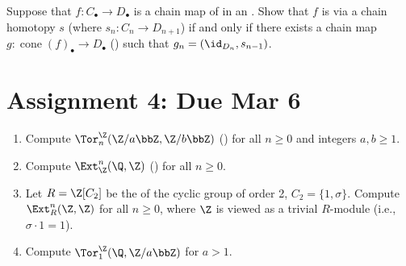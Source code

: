 \begin{problem}
    Suppose that $f: C_\bullet \to D_\bullet$ is a chain map of  in an . 
    Show that $f$ is  via a chain homotopy $s$ (where $s_n: C_n \to D_{n+1}$) if and only if there exists a chain map $g: \operatorname{cone}(f)_\bullet \to D_\bullet$ () such that $g_n = (\id_{D_n}, s_{n-1})$. 
\end{problem}


\section{Assignment 4: Due Mar 6}


\begin{problem}
\begin{enumerate}
    \item Compute $\Tor_n^{\Z}(\Z/a \bbZ, \Z/b \bbZ)$ () for all $n \geq 0$ and integers $a,b \geq 1$.
    
    \item Compute $\Ext_{\Z}^n(\Q, \Z)$ () for all $n \geq 0$. 
    
    \item Let $R = \Z[C_2]$ be the  of the cyclic group of order 2, $C_2 = \{1, \sigma\}$. Compute $\Ext_R^n(\Z, \Z)$ for all $n \geq 0$, where $\Z$ is viewed as a trivial $R$-module (i.e., $\sigma \cdot 1 = 1$).
    
    \item Compute $\Tor_1^{\Z}(\Q, \Z/a \bbZ)$ for $a > 1$. 

\end{enumerate}
\end{problem}

